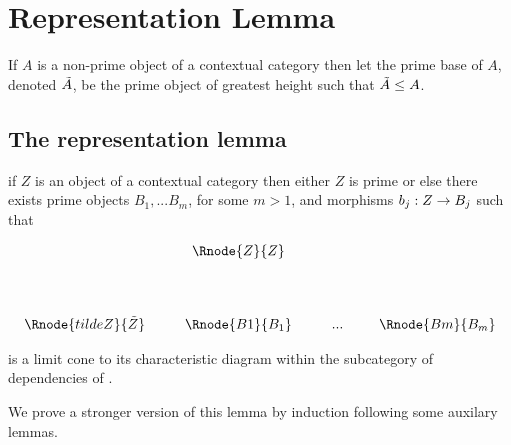 \documentclass[10pt,a4paper]{scrartcl}
\begin{document}
\section{Representation Lemma}
\begin{definition}
If $A$ is a non-prime object of a contextual category \ccat then let the prime base of $A$, denoted $\tilde{A}$,  be the 
prime object of \ccat greatest height such that $\tilde{A} \leq A$.
\end{definition}
\subsection{The representation lemma}

\begin{lemma}
if $Z$ is an object of a contextual category \ccat then either $Z$ is prime or else 
there exists prime objects $B_1,...B_m$, for some $m > 1$, and morphisms $b_j : Z \rightarrow B_j$ such that

\begin{center}
\begin{displaymath}
\begin{array}{cp{0.3cm}c         p{0.3cm}  c p{0.2cm} c}
               & & \Rnode{Z}{Z} & &     & &  \\ [1.4cm]
\Rnode{tildeZ}{\pbase{Z}}& &\Rnode{B1}{B_1}& & ... & &\Rnode{Bm}{B_m}
\end{array}
\end{displaymath}
\end{center}
\noindent
is a limit cone to its characteristic diagram within the subcategory of dependencies of \ccat.
\end{lemma}
We prove a stronger version of this lemma by induction following some 
auxilary lemmas.
\end{document}
